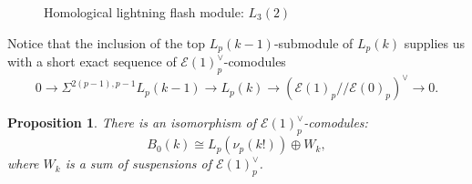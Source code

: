 \documentclass{amsart}
\newtheorem{proposition}[theorem]{Proposition}
\theoremstyle{plain}
\numberwithin{theorem}{section}
\numberwithin{equation}{section}
\numberwithin{figure}{section}
\newcommand{\cE}{{\mathcal E}}
\newcommand{\0}{\langle 0 \rangle }
\begin{document}
\begin{figure}[ht]
{}
    \caption{Homological lightning flash module: $L_3(2)$}
    \label{fig:HomLightFlash}
\end{figure}

Notice that the inclusion of the top $L_p(k-1)$-submodule of $L_p(k)$ supplies us with a short exact sequence of $\mathcal{E}(1)^\vee_p$-comodules
\begin{equation}
\label{lightning flash ses}
0 \to \Sigma^{2(p-1),p-1} L_p(k-1) \to L_p (k) \to \left( \cE(1)_p // \cE(0)_p \right)^\vee \to 0.
\end{equation}

\begin{proposition}
\label{prop:LightningFlashBGiso} 
    There is an isomorphism of $\mathcal{E}(1)_p^\vee$-comodules:
    \[B_0(k) \cong L_p(\nu_p(k!)) \oplus W_k,\]
    where $W_k$ is a sum of suspensions of $\mathcal{E}(1)_p^\vee$.
\end{proposition}
\end{document}
